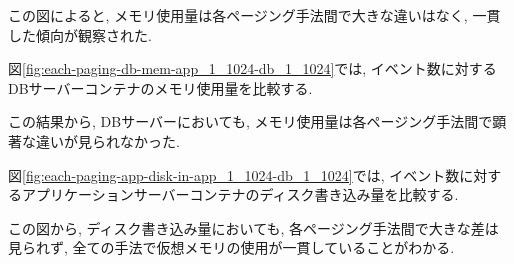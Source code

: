 \documentclass[../../../../main]{subfiles}
\begin{document}
    

    この図によると, メモリ使用量は各ページング手法間で大きな違いはなく, 一貫した傾向が観察された.

    図\ref{fig:each-paging-db-mem-app_1_1024-db_1_1024}では, イベント数に対するDBサーバーコンテナのメモリ使用量を比較する.

    

    この結果から, DBサーバーにおいても, メモリ使用量は各ページング手法間で顕著な違いが見られなかった.

    \label{subsubsubsec:result-each-paging-only-limit-disk-in}

    図\ref{fig:each-paging-app-disk-in-app_1_1024-db_1_1024}では, イベント数に対するアプリケーションサーバーコンテナのディスク書き込み量を比較する.

    

    この図から, ディスク書き込み量においても, 各ページング手法間で大きな差は見られず, 全ての手法で仮想メモリの使用が一貫していることがわかる.
\end{document}
